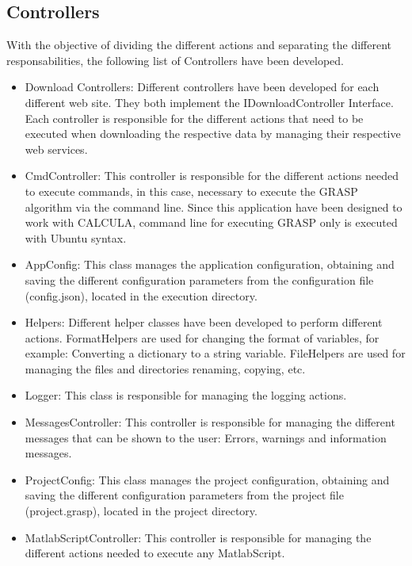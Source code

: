 \subsection{Controllers}
{With the objective of dividing the different actions and separating the different responsabilities, the following list of Controllers have been developed. }
\begin{itemize}
    \item Download Controllers: Different controllers have been developed for each different web site. They both implement the IDownloadController Interface. Each controller is responsible for the different actions that need to be executed when downloading the respective data by managing their respective web services. 
    \item CmdController: This controller is responsible for the different actions needed to execute commands, in this case, necessary to execute the GRASP algorithm via the command line. Since this application have been designed to work with CALCULA, command line for executing GRASP only is executed with Ubuntu syntax.
    \item AppConfig: This class manages the application configuration, obtaining and saving the different configuration parameters from the configuration file (config.json), located in the execution directory.
    \item Helpers: Different helper classes have been developed to perform different actions. FormatHelpers are used for changing the format of variables, for example: Converting a dictionary to a string variable. FileHelpers are used for managing the files and directories renaming, copying, etc.
    \item Logger: This class is responsible for managing the logging actions.
    \item MessagesController: This controller is responsible for managing the different messages that can be shown to the user: Errors, warnings and information messages.
    \item ProjectConfig: This class manages the project configuration, obtaining and saving the different configuration parameters from the project file (project.grasp), located in the project directory.
    \item MatlabScriptController: This controller is responsible for managing the different actions needed to execute any MatlabScript.
\end{itemize}
